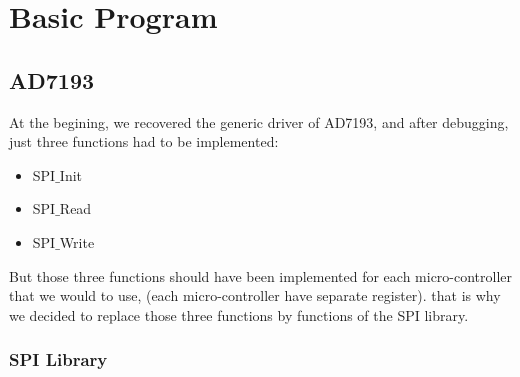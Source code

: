 \documentclass[10pt,a4paper]{report}
\begin{document}
\chapter{Basic Program}
\section{AD7193}
At the begining, we recovered the generic driver of AD7193, and after debugging, just three functions had to be implemented: 
\begin{itemize}
\item SPI$\_$Init
\item SPI$\_$Read
\item SPI$\_$Write\\
\end{itemize}

But those three functions should have been implemented for each micro-controller that we would to use, (each micro-controller have separate register).
that is why we decided to replace those three functions by functions of the SPI library.

\subsection{SPI Library}
\end{document}
